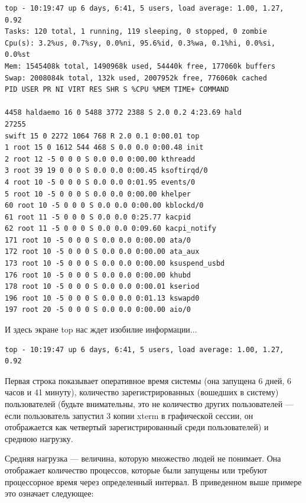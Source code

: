 \documentclass[10pt]{book}
\begin{document}
\vspace{3mm}
\begin{tcolorbox}
\begin{lstlisting}
top - 10:19:47 up 6 days, 6:41, 5 users, load average: 1.00, 1.27, 0.92
Tasks: 120 total, 1 running, 119 sleeping, 0 stopped, 0 zombie
Cpu(s): 3.2%us, 0.7%sy, 0.0%ni, 95.6%id, 0.3%wa, 0.1%hi, 0.0%si, 0.0%st
Mem: 1545408k total, 1490968k used, 54440k free, 177060k buffers
Swap: 2008084k total, 132k used, 2007952k free, 776060k cached 
PID USER PR NI VIRT RES SHR S %CPU %MEM TIME+ COMMAND 

4458 haldaemo 16 0 5488 3772 2388 S 2.0 0.2 4:23.69 hald
27255
swift 15 0 2272 1064 768 R 2.0 0.1 0:00.01 top 
1 root 15 0 1612 544 468 S 0.0 0.0 0:00.48 init
2 root 12 -5 0 0 0 S 0.0 0.0 0:00.00 kthreadd 
3 root 39 19 0 0 0 S 0.0 0.0 0:00.45 ksoftirqd/0 
4 root 10 -5 0 0 0 S 0.0 0.0 0:01.95 events/0
5 root 10 -5 0 0 0 S 0.0 0.0 0:00.00 khelper 
60 root 10 -5 0 0 0 S 0.0 0.0 0:00.00 kblockd/0
61 root 11 -5 0 0 0 S 0.0 0.0 0:25.77 kacpid
62 root 11 -5 0 0 0 S 0.0 0.0 0:09.60 kacpi_notify 
171 root 10 -5 0 0 0 S 0.0 0.0 0:00.00 ata/0
172 root 10 -5 0 0 0 S 0.0 0.0 0:00.00 ata_aux
173 root 10 -5 0 0 0 S 0.0 0.0 0:00.00 ksuspend_usbd 
176 root 10 -5 0 0 0 S 0.0 0.0 0:00.00 khubd 
178 root 10 -5 0 0 0 S 0.0 0.0 0:00.01 kseriod
196 root 10 -5 0 0 0 S 0.0 0.0 0:01.13 kswapd0
197 root 20 -5 0 0 0 S 0.0 0.0 0:00.00 aio/0
\end{lstlisting}
\end{tcolorbox}

И здесь экране top нас ждет изобилие информации...

\vspace{3mm}
\begin{tcolorbox}
\begin{lstlisting}
top - 10:19:47 up 6 days, 6:41, 5 users, load average: 1.00, 1.27, 0.92
\end{lstlisting}
\end{tcolorbox}

Первая строка показывает оперативное время системы (она запущена 6 дней, 6 часов и 41 минуту), количество зарегистрированных (вошедших в систему) пользователей (будьте внимательны, это не количество других пользователей — если пользователь запустил 3 копии xterm в графической сессии, он отображается как четвертый зарегистрированный среди пользователей) и среднюю нагрузку.

Средняя нагрузка — величина, которую множество людей не понимает. Она отображает количество процессов, которые были запущены или требуют процессорное время через определенный интервал. В приведенном выше примере это означает следующее:
\end{document}
